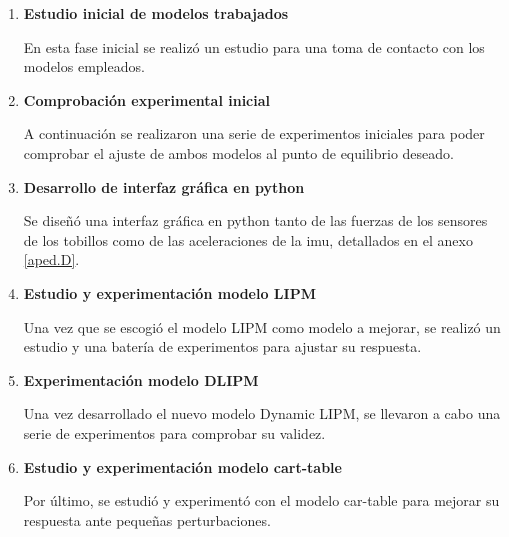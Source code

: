 \begin{enumerate}

\item \textbf{Estudio inicial de modelos trabajados}

En esta fase inicial se realizó un estudio para una toma de contacto con los modelos empleados.

\item \textbf{Comprobación experimental inicial}

A continuación se realizaron una serie de experimentos iniciales para poder comprobar el ajuste de ambos modelos al punto de equilibrio deseado.

\item \textbf{Desarrollo de interfaz gráfica en python}

Se diseñó una interfaz gráfica en python tanto de las fuerzas de los sensores de los tobillos como de las aceleraciones de la imu, detallados en el anexo \ref{aped.D}.

\item \textbf{Estudio y experimentación modelo LIPM}

Una vez que se escogió el modelo LIPM como modelo a mejorar, se realizó un estudio y una batería de experimentos para ajustar su respuesta.

\item \textbf{Experimentación modelo DLIPM}

Una vez desarrollado el nuevo modelo Dynamic LIPM, se llevaron a cabo una serie de experimentos para comprobar su validez.

\item \textbf{Estudio y experimentación modelo cart-table}

Por último, se estudió y experimentó con el modelo car-table para mejorar su respuesta ante pequeñas perturbaciones.

\end{enumerate}

\afterpage{\null\newpage}
\newpage

